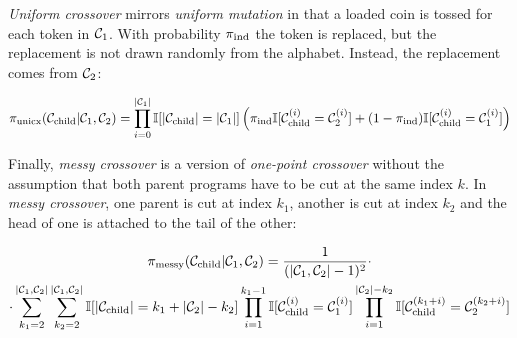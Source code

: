 \emph{Uniform crossover} mirrors \emph{uniform mutation} in that a loaded coin is tossed for each token in $\mathcal{C}_1$. With probability $\pi_\text{ind}$ the token is replaced, but the replacement is not drawn randomly from the alphabet. Instead, the replacement comes from $\mathcal{C}_2$:

\begin{equation}
    \pi_\text{unicx}(\mathcal{C}_\text{child}|\mathcal{C}_1,\mathcal{C}_2) = \prod\limits_{i=0}^{|\mathcal{C}_1|} \mathbb{I}[|\mathcal{C}_\text{child}|=|\mathcal{C}_1|] \\ \left(\pi_\text{ind} \mathbb{I}[\mathcal{C}_\text{child}^{(i)} = \mathcal{C}_2^{(i)}] + (1 - \pi_\text{ind}) \mathbb{I}[\mathcal{C}_\text{child}^{(i)} = \mathcal{C}_1^{(i)}] \right)
\end{equation}

Finally, \emph{messy crossover} is a version of \emph{one-point crossover} without the assumption that both parent programs have to be cut at the same index $k$.
In \emph{messy crossover}, one parent is cut at index $k_1$, another is cut at index $k_2$ and the head of one is attached to the tail of the other:

\begin{multline}
    \pi_\text{messy}(\mathcal{C}_\text{child}|\mathcal{C}_1,\mathcal{C}_2) = \frac{1}{(|\mathcal{C}_1,\mathcal{C}_2|-1)^2} \cdot \\ \cdot \sum\limits_{k_1=2}^{|\mathcal{C}_1,\mathcal{C}_2|} \sum\limits_{k_2=2}^{|\mathcal{C}_1,\mathcal{C}_2|} \mathbb{I}[|\mathcal{C}_\text{child}|=k_1+|\mathcal{C}_2|-k_2] \prod\limits_{i=1}^{k_1-1} \mathbb{I}[\mathcal{C}_\text{child}^{(i)} = \mathcal{C}_1^{(i)}] \prod\limits_{i=1}^{|\mathcal{C}_2|-k_2} \mathbb{I}[\mathcal{C}_\text{child}^{(k_1+i)} = \mathcal{C}_2^{(k_2+i)}]
\end{multline}

